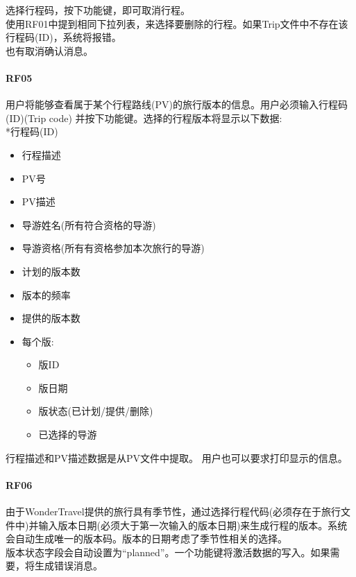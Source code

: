 选择行程码，按下功能键，即可取消行程。\\
使用RF01中提到相同下拉列表，来选择要删除的行程。如果Trip文件中不存在该行程码(ID)，系统将报错。\\
也有取消确认消息。\\

\hypertarget{rf05}{%
\paragraph{RF05}\label{rf05}}

用户将能够查看属于某个行程路线(PV)的旅行版本的信息。用户必须输入行程码(ID)(Trip
code) 并按下功能键。选择的行程版本将显示以下数据:\\
*行程码(ID)

\begin{itemize}
\tightlist
\item
  行程描述
\item
  PV号
\item
  PV描述
\item
  导游姓名(所有符合资格的导游)
\item
  导游资格(所有有资格参加本次旅行的导游)
\item
  计划的版本数
\item
  版本的频率
\item
  提供的版本数
\item
  每个版:

  \begin{itemize}
  \tightlist
  \item
    版ID
  \item
    版日期
  \item
    版状态(已计划/提供/删除)
  \item
    已选择的导游\\
  \end{itemize}
\end{itemize}

行程描述和PV描述数据是从PV文件中提取。 用户也可以要求打印显示的信息。\\

\hypertarget{rf06}{%
\paragraph{RF06}\label{rf06}}

由于WonderTravel提供的旅行具有季节性，通过选择行程代码(必须存在于旅行文件中)并输入版本日期(必须大于第一次输入的版本日期)来生成行程的版本。系统会自动生成唯一的版本码。版本的日期考虑了季节性相关的选择。\\
版本状态字段会自动设置为``planned''。一个功能键将激活数据的写入。如果需要，将生成错误消息。\\

